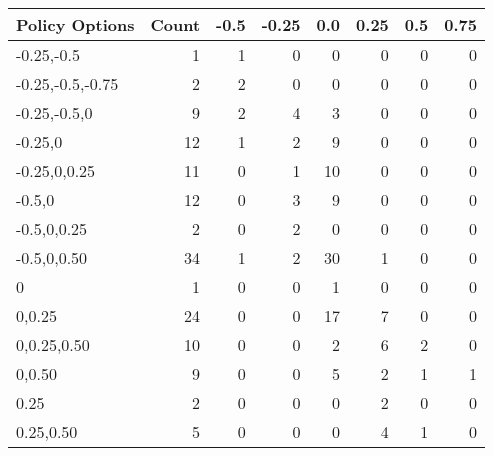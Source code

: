 \begin{tabular}{lrrrrrrr}
\toprule
   Policy Options &  Count &  -0.5 &  -0.25 &  0.0 &  0.25 &  0.5 &  0.75 \\
\midrule
       -0.25,-0.5 &      1 &     1 &      0 &    0 &     0 &    0 &     0 \\
 -0.25,-0.5,-0.75 &      2 &     2 &      0 &    0 &     0 &    0 &     0 \\
     -0.25,-0.5,0 &      9 &     2 &      4 &    3 &     0 &    0 &     0 \\
          -0.25,0 &     12 &     1 &      2 &    9 &     0 &    0 &     0 \\
     -0.25,0,0.25 &     11 &     0 &      1 &   10 &     0 &    0 &     0 \\
           -0.5,0 &     12 &     0 &      3 &    9 &     0 &    0 &     0 \\
      -0.5,0,0.25 &      2 &     0 &      2 &    0 &     0 &    0 &     0 \\
      -0.5,0,0.50 &     34 &     1 &      2 &   30 &     1 &    0 &     0 \\
                0 &      1 &     0 &      0 &    1 &     0 &    0 &     0 \\
           0,0.25 &     24 &     0 &      0 &   17 &     7 &    0 &     0 \\
      0,0.25,0.50 &     10 &     0 &      0 &    2 &     6 &    2 &     0 \\
           0,0.50 &      9 &     0 &      0 &    5 &     2 &    1 &     1 \\
             0.25 &      2 &     0 &      0 &    0 &     2 &    0 &     0 \\
        0.25,0.50 &      5 &     0 &      0 &    0 &     4 &    1 &     0 \\
\bottomrule
\end{tabular}
